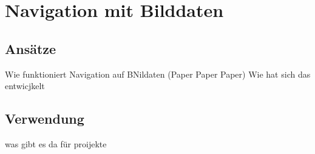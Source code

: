 %
\chapter{Navigation mit Bilddaten}

\section{Ansätze}
Wie funktioniert Navigation auf BNildaten
(Paper Paper Paper)
Wie hat sich das entwicjkelt
\section{Verwendung}

was gibt es da für proijekte 


